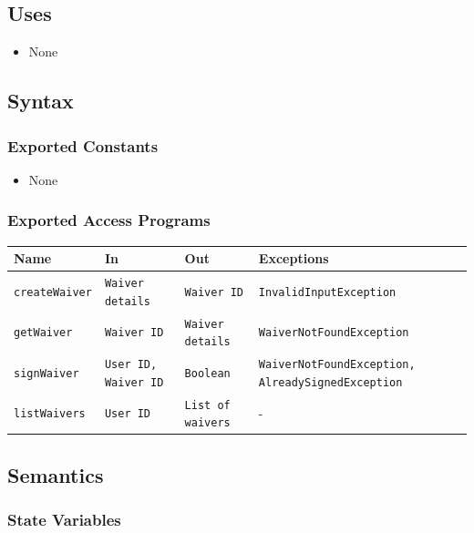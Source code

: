 \documentclass[12pt, titlepage]{article}
\begin{document}
\subsection{Uses}

\begin{itemize}
    \item None
\end{itemize}

\subsection{Syntax}

\subsubsection{Exported Constants}
\begin{itemize}
    \item None
\end{itemize}

\subsubsection{Exported Access Programs}
\begin{center}
  \begin{tabular}{p{3cm} p{4cm} p{4cm} p{5cm}}
    \toprule
    \textbf{Name} & \textbf{In} & \textbf{Out} & \textbf{Exceptions} \\
    \midrule
    \texttt{createWaiver} & \texttt{Waiver details} & \texttt{Waiver ID} & \texttt{InvalidInputException} \\
    \texttt{getWaiver}    & \texttt{Waiver ID}      & \texttt{Waiver details} & \texttt{WaiverNotFoundException} \\
    \texttt{signWaiver}   & \texttt{User ID, Waiver ID} & \texttt{Boolean} & \texttt{WaiverNotFoundException, AlreadySignedException} \\
    \texttt{listWaivers}  & \texttt{User ID}         & \texttt{List of waivers} & - \\
    \bottomrule
  \end{tabular}
\end{center}


\subsection{Semantics}

\subsubsection{State Variables}
\end{document}
